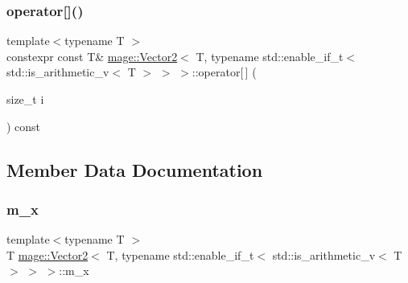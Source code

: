 \subsubsection{\texorpdfstring{operator[]()}{operator[]()}\hspace{0.1cm}{\footnotesize\ttfamily [2/2]}}
{\footnotesize\ttfamily template$<$typename T $>$ \\
constexpr const T\& \hyperlink{structmage_1_1_vector2}{mage\+::\+Vector2}$<$ T, typename std\+::enable\+\_\+if\+\_\+t$<$ std\+::is\+\_\+arithmetic\+\_\+v$<$ T $>$ $>$ $>$\+::operator\mbox{[}$\,$\mbox{]} (\begin{DoxyParamCaption}\item[{size\+\_\+t}]{i }\end{DoxyParamCaption}) const\hspace{0.3cm}{\ttfamily [noexcept]}}



\subsection{Member Data Documentation}
\hypertarget{structmage_1_1_vector2_3_01_t_00_01typename_01std_1_1enable__if__t_3_01std_1_1is__arithmetic__v_3_01_t_01_4_01_4_01_4_a7debd78f3781c92b8612631331571740}{}\label{structmage_1_1_vector2_3_01_t_00_01typename_01std_1_1enable__if__t_3_01std_1_1is__arithmetic__v_3_01_t_01_4_01_4_01_4_a7debd78f3781c92b8612631331571740} 
\subsubsection{\texorpdfstring{m\+\_\+x}{m\_x}}
{\footnotesize\ttfamily template$<$typename T $>$ \\
T \hyperlink{structmage_1_1_vector2}{mage\+::\+Vector2}$<$ T, typename std\+::enable\+\_\+if\+\_\+t$<$ std\+::is\+\_\+arithmetic\+\_\+v$<$ T $>$ $>$ $>$\+::m\+\_\+x}

\hypertarget{structmage_1_1_vector2_3_01_t_00_01typename_01std_1_1enable__if__t_3_01std_1_1is__arithmetic__v_3_01_t_01_4_01_4_01_4_ac84020904b44330213e8d1c21b4972ab}{}\label{structmage_1_1_vector2_3_01_t_00_01typename_01std_1_1enable__if__t_3_01std_1_1is__arithmetic__v_3_01_t_01_4_01_4_01_4_ac84020904b44330213e8d1c21b4972ab} 
